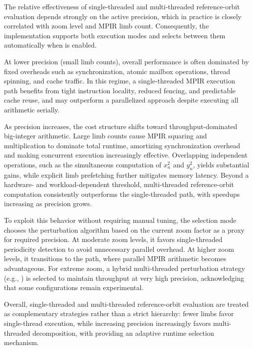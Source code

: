 The relative effectiveness of single-threaded and multi-threaded reference-orbit
evaluation depends strongly on the active precision, which in practice is
closely correlated with zoom level and MPIR limb count.  Consequently, the
implementation supports both execution modes and selects between them
automatically when  is enabled.

At lower precision (small limb counts), overall performance is often dominated
by fixed overheads such as synchronization, atomic mailbox operations, thread
spinning, and cache traffic.  In this regime, a single-threaded MPIR execution
path benefits from tight instruction locality, reduced fencing, and predictable
cache reuse, and may outperform a parallelized approach despite executing all
arithmetic serially.

As precision increases, the cost structure shifts toward throughput-dominated
big-integer arithmetic.  Large limb counts cause MPIR squaring and multiplication
to dominate total runtime, amortizing synchronization overhead and making
concurrent execution increasingly effective.  Overlapping independent
operations, such as the simultaneous computation of \(x_n^2\) and \(y_n^2\),
yields substantial gains, while explicit limb prefetching further mitigates
memory latency.  Beyond a hardware- and workload-dependent threshold,
multi-threaded reference-orbit computation consistently outperforms the
single-threaded path, with speedups increasing as precision grows.

To exploit this behavior without requiring manual tuning, the 
selection mode chooses the perturbation algorithm based on the current zoom
factor as a proxy for required precision.  At moderate zoom levels, it favors
single-threaded periodicity detection to avoid unnecessary parallel overhead.
At higher zoom levels, it transitions to the  path, where
parallel MPIR arithmetic becomes advantageous.  For extreme zoom, a hybrid
multi-threaded perturbation strategy (e.g.,
) is selected to maintain throughput at
very high precision, acknowledging that some configurations remain
experimental.

Overall, single-threaded and multi-threaded reference-orbit evaluation are
treated as complementary strategies rather than a strict hierarchy: fewer limbs
favor single-thread execution, while increasing precision increasingly favors
multi-threaded decomposition, with  providing an adaptive runtime
selection mechanism.


